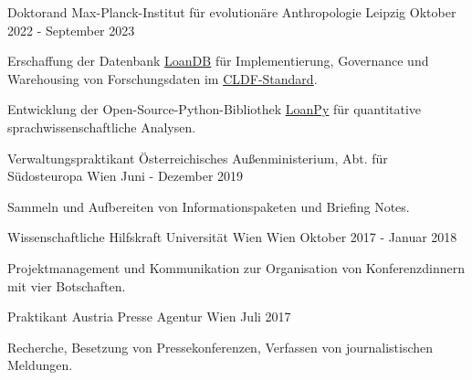 \begin{cventries}

  \cventry
    {Doktorand} %
    {Max-Planck-Institut für evolutionäre Anthropologie} %
    {Leipzig} %
    {Oktober 2022 - September 2023} %
    {
      \begin{cvitems} %
      \item{Erschaffung der Datenbank \underline{\href{https://github.com/LoanDB/}{LoanDB}} für Implementierung, Governance und Warehousing von Forschungsdaten im \underline{\href{https://cldf.clld.org/}{CLDF-Standard}}.}
      \item{Entwicklung der Open-Source-Python-Bibliothek \underline{\href{https://pypi.org/project/loanpy/}{LoanPy}} für quantitative sprachwissenschaftliche Analysen.}
      \end{cvitems}
    }
    
  \cventry
    {Verwaltungspraktikant} %
    {Österreichisches Außenministerium, Abt. für Südosteuropa} %
    {Wien} %
    {Juni - Dezember 2019} %
    {
      \begin{cvitems} %
        \item{Sammeln und Aufbereiten von Informationspaketen und Briefing Notes.}
      \end{cvitems}
    }

  \cventry
    {Wissenschaftliche Hilfskraft} %
    {Universität Wien} %
    {Wien} %
    {Oktober 2017 - Januar 2018} %
    {
    \begin{cvitems}
    \item{Projektmanagement und Kommunikation zur Organisation von Konferenzdinnern mit vier Botschaften.}
    \end{cvitems}
    }
    
  \cventry
    {Praktikant} %
    {Austria Presse Agentur} %
    {Wien} %
    {Juli 2017} %
    {
    \begin{cvitems}
    \item{Recherche, Besetzung von Pressekonferenzen, Verfassen von journalistischen Meldungen.}
    \end{cvitems}
    }

       

\end{cventries}
